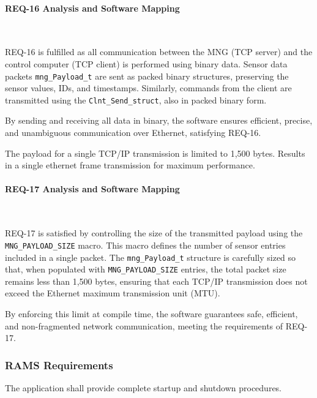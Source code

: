\documentclass{article}
\begin{document}
\paragraph{REQ-16 Analysis and Software Mapping}\


REQ-16 is fulfilled as all communication between the MNG (TCP server) and the 
control computer (TCP client) is performed using binary data. Sensor data packets 
\texttt{mng\_Payload\_t} are sent as packed binary structures, preserving the sensor values, 
IDs, and timestamps. Similarly, commands from the client are transmitted using the 
\texttt{Clnt\_Send\_struct}, also in packed binary form. 

By sending and receiving all data in binary, the software ensures efficient, 
precise, and unambiguous communication over Ethernet, satisfying REQ-16.


\begin{tcolorbox}[
    title=REQ-17,
    colback=gray!5,
    colframe=black,
    fonttitle=\bfseries
]
The payload for a single TCP/IP transmission is limited to 1,500 bytes.
Results in a single ethernet frame transmission for maximum performance.
\end{tcolorbox}

\paragraph{REQ-17 Analysis and Software Mapping}\

REQ-17 is satisfied by controlling the size of the transmitted payload using the 
\texttt{MNG\_PAYLOAD\_SIZE}  macro. This macro defines the number of sensor entries included 
in a single packet. The  \texttt{mng\_Payload\_t} structure is carefully sized so that, when 
populated with \texttt{MNG\_PAYLOAD\_SIZE} entries, the total packet size remains less 
than 1,500 bytes, ensuring that each TCP/IP transmission does not exceed the 
Ethernet maximum transmission unit (MTU).

By enforcing this limit at compile time, the software guarantees safe, efficient, 
and non-fragmented network communication, meeting the requirements of REQ-17.

\subsubsection{RAMS Requirements}

\begin{tcolorbox}[
    title=REQ-18,
    colback=gray!5,
    colframe=black,
    fonttitle=\bfseries
]
The application shall provide complete startup and shutdown procedures.
\end{tcolorbox}
\end{document}
